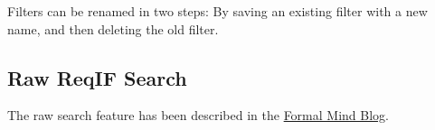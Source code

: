 \begin{info}
Filters can be renamed in two steps: By saving an existing filter with a new name, and then deleting the old filter.
\end{info}

\subsection{Raw ReqIF Search}
\label{sec:raw_search}

The raw search feature has been described in the \href{http://formalmind.com/en/blog/formalmind-studio-pror-improvements-and-beta-program-about-start}{Formal Mind Blog}.

